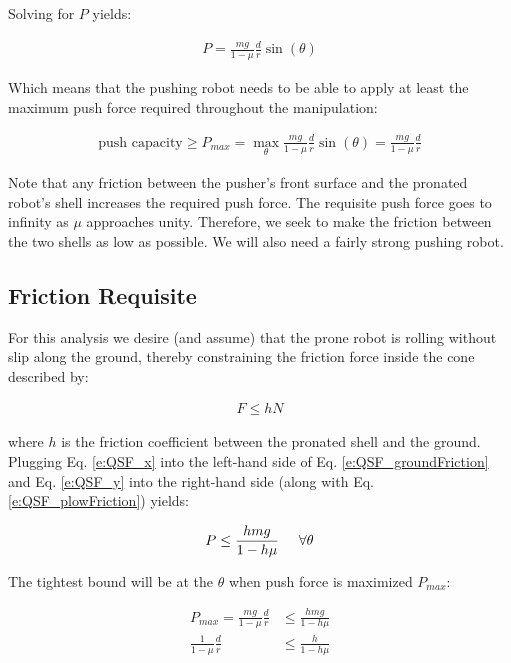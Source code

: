 \documentclass[letterpaper]{report}
\begin{document}
Solving for $P$ yields:

\begin{align}
  P = \frac{mg}{1-\mu} \frac{d}{r} \sin(\theta)
\end{align}

Which means that the pushing robot needs to be able to apply at least the maximum push force required throughout the manipulation:

\begin{align}
  \text{push capacity} \geq P_{max} = \max_\theta \frac{mg}{1-\mu} \frac{d}{r} \sin(\theta) = \frac{mg}{1-\mu} \frac{d}{r}
\end{align}

Note that any friction between the pusher's front surface and the pronated robot's shell increases the required push force.
The requisite push force goes to infinity as $\mu$ approaches unity.
Therefore, we seek to make the friction between the two shells as low as possible.
We will also need a fairly strong pushing robot.

\subsection{Friction Requisite}
For this analysis we desire (and assume) that the prone robot is rolling without slip along the ground, thereby constraining the friction force inside the cone described by:

\begin{align}
  F \leq h N \label{e:QSF_groundFriction}
\end{align}

where $h$ is the friction coefficient between the pronated shell and the ground.
Plugging Eq. \ref{e:QSF_x} into the left-hand side of Eq. \ref{e:QSF_groundFriction} and Eq. \ref{e:QSF_y} into the right-hand side (along with Eq. \ref{e:QSF_plowFriction}) yields:

\begin{align}
  P \leq \frac{hmg}{1-h\mu} \label{e:QSF_pushConstraint1} \hspace{5mm} \forall \theta
\end{align}

The tightest bound will be at the $\theta$ when push force is maximized $P_{max}$:

\begin{align}
  P_{max} = \frac{mg}{1-\mu} \frac{d}{r} &\leq \frac{hmg}{1-h\mu} \\
  \frac{1}{1-\mu} \frac{d}{r} &\leq \frac{h}{1-h\mu}
  \label{e:gndFrictionReq}
\end{align}
\end{document}
